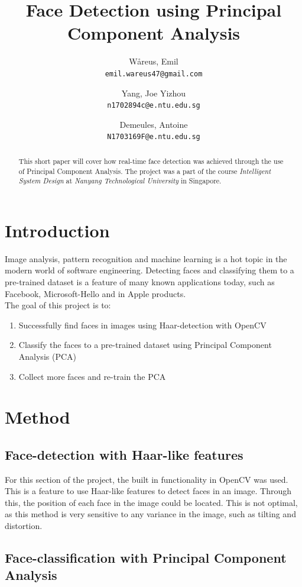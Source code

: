 \documentclass[a4paper]{article}
\title{Face Detection using Principal Component Analysis}
\author{
  Wåreus, Emil\\
  \texttt{emil.wareus47@gmail.com}
  \and
  Yang, Joe Yizhou\\
  \texttt{n1702894c@e.ntu.edu.sg}
  \and
  Demeules, Antoine\\
  \texttt{N1703169F@e.ntu.edu.sg}
}
\begin{document}
\maketitle

\begin{abstract}
This short paper will cover how real-time face detection was achieved through the use of Principal  Component Analysis. The project was a part of the course \textit{Intelligent System Design} at \textit{Nanyang Technological University} in Singapore. 
\end{abstract}

\section{Introduction}

Image analysis, pattern recognition and machine learning is a hot topic in the modern world of software engineering. Detecting faces and classifying them to a pre-trained dataset is a feature of many known applications today, such as Facebook, Microsoft-Hello and in Apple products. 
\\
The goal of this project is to: 
\begin{enumerate}
\item Successfully find faces in images using Haar-detection with OpenCV
\item Classify the faces to a pre-trained dataset using Principal Component Analysis (PCA)
\item Collect more faces and re-train the PCA
\end{enumerate}


\section{Method}

\subsection{Face-detection with Haar-like features}
For this section of the project, the built in functionality in OpenCV was used. This is a feature to use Haar-like features to detect faces in an image. Through this, the position of each face in the image could be located. This is not optimal, as this method is very sensitive to any variance in the image, such as tilting and distortion. 


\subsection{Face-classification with Principal Component Analysis}
\end{document}
